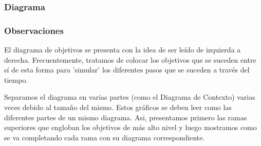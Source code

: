 \subsubsection{Diagrama}

\subsubsection{Observaciones}

El diagrama de objetivos se presenta con la idea de ser leído de izquierda a derecha. Frecuentemente, tratamos de colocar los objetivos que se suceden entre sí de esta forma para 'simular' los diferentes pasos que se suceden a través del tiempo.

Separamos el diagrama en varias partes (como el Diagrama de Contexto) varias veces debido al tamaño del mismo. Estos gráficos se deben leer como las diferentes partes de un mismo diagrama. Asi, presentamos primero las ramas superiores que engloban los objetivos de más alto nivel y luego mostramos como se va completando cada rama con su diagrama correspondiente.
